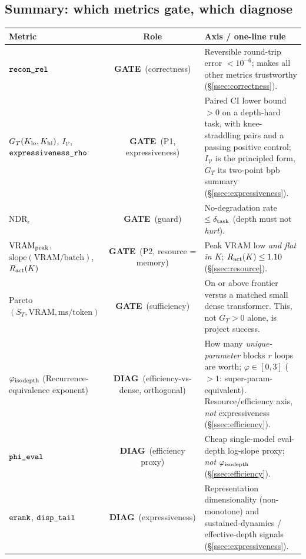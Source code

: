 \documentclass[11pt]{article}
\newcommand{\code}[1]{\texttt{#1}}
\newcommand{\vram}{\mathrm{VRAM}}
\newcommand{\GATE}{\textcolor{gate}{\textbf{GATE}}}
\newcommand{\DIAG}{\textcolor{diag}{\textbf{DIAG}}}
\begin{document}
\subsection{Summary: which metrics gate, which diagnose}
\renewcommand{\arraystretch}{1.2}
\begin{center}
\footnotesize
\begin{tabularx}{\textwidth}{@{}L{0.27\textwidth} c L{0.50\textwidth}@{}}
\toprule
\textbf{Metric} & \textbf{Role} & \textbf{Axis / one-line rule} \\
\midrule
\(\code{\detokenize{recon_rel}}\) & \GATE\ (correctness) & Reversible round-trip error \(<10^{-6}\); makes all other metrics trustworthy (\S\ref{ssec:correctness}). \\
\(G_T(K_{\rm lo},K_{\rm hi})\), \(I_{\mathcal V}\), \(\code{\detokenize{expressiveness_rho}}\) & \GATE\ (P1, expressiveness) & Paired CI lower bound \(>0\) on a depth-hard task, with knee-straddling pairs and a passing positive control; \(I_{\mathcal V}\) is the principled form, \(G_T\) its two-point bpb summary (\S\ref{ssec:expressiveness}). \\
\(\mathrm{NDR}_\epsilon\) & \GATE\ (guard) & No-degradation rate \(\le\delta_{\rm task}\) (depth must not \emph{hurt}). \\
\(\vram_{\rm peak}\), \(\mathrm{slope}(\vram/\text{batch})\), \(R_{\rm act}(K)\) & \GATE\ (P2, resource = memory) & Peak VRAM low \emph{and flat in \(K\)}; \(R_{\rm act}(K)\le1.10\) (\S\ref{ssec:resource}). \\
Pareto \((S_T,\vram,\mathrm{ms/token})\) & \GATE\ (sufficiency) & On or above frontier versus a matched small dense transformer.  This, not \(G_T>0\) alone, is project success. \\
\midrule
\(\varphi_{\rm isodepth}\) (Recurrence-equivalence exponent) & \DIAG\ (efficiency-vs-dense, orthogonal) & How many \emph{unique-parameter} blocks \(r\) loops are worth; \(\varphi\in[0,3]\) (\(>1\): super-param-equivalent).  Resource/efficiency axis, \emph{not} expressiveness (\S\ref{ssec:efficiency}). \\
\(\code{\detokenize{phi_eval}}\) & \DIAG\ (efficiency proxy) & Cheap single-model eval-depth log-slope proxy; \emph{not} \(\varphi_{\rm isodepth}\) (\S\ref{ssec:efficiency}). \\
\(\code{\detokenize{erank}}\), \(\code{\detokenize{disp_tail}}\) & \DIAG\ (expressiveness) & Representation dimensionality (non-monotone) and sustained-dynamics / effective-depth signals (\S\ref{ssec:expressiveness}). \\

\end{tabularx}
\end{center}
\end{document}
